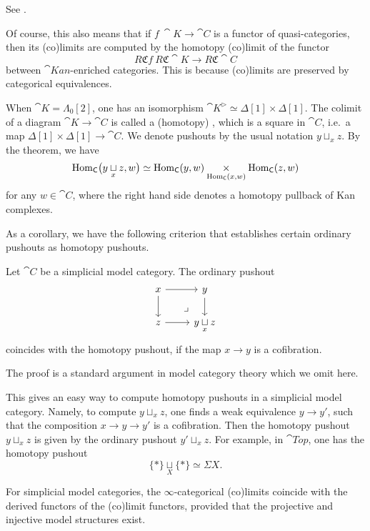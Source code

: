 See \cite[Theorem~4.2.4.1]{htt}.

Of course, this also means that if $f\:\cat K\to\cat C$
is a functor of quasi-categories, then its (co)limits are computed by
the homotopy (co)limit of the functor
\[ R\mathfrak Cf\:R\mathfrak C\cat K\to R\mathfrak C\cat C \]
between $\cat{Kan}$-enriched categories.
This is because (co)limits are preserved by categorical equivalences.

\begin{example}
    When $\cat K=\Lambda_0[2]$, one has an isomorphism
    $\cat K^\vartriangleright\simeq\Delta[1]\times\Delta[1]$.
    The colimit of a diagram $\cat K\to\cat C$ is called a (homotopy) ,
    which is a square in $\cat C$, i.e.\ a map $\Delta[1]\times\Delta[1]\to\cat C$.
    We denote pushouts by the usual notation $y\sqcup_xz$.
    By the theorem, we have 
    \[ \operatorname{Hom}_{\mathsf{C}}\bigl(y\underset{x}{\sqcup}z,w\bigr)\simeq
    \operatorname{Hom}_{\mathsf{C}}(y,w)\underset{\operatorname{Hom}_{\mathsf{C}}(x,w)}{\times}\operatorname{Hom}_{\mathsf{C}}(z,w) \]
    for any $w\in\cat C$,
    where the right hand side denotes a homotopy pullback of Kan complexes. 
    \varqed
\end{example}

As a corollary, we have the following criterion
that establishes certain ordinary pushouts as homotopy pushouts.

\begin{proposition}
    Let $\cat C$ be a simplicial model category.
    The ordinary pushout 
    \[ \begin{tikzcd}
        x\ar[r]\ar[d]\ar[dr,phantom,pos=.7,"\lrcorner"] & y\ar[d] \\
        z\ar[r] & y\underset{x}{\sqcup}z
    \end{tikzcd} \]
    coincides with the homotopy pushout,
    if the map $x\to y$ is a cofibration.
\end{proposition}

The proof is a standard argument in model category theory 
which we omit here.

This gives an easy way to compute homotopy pushouts
in a simplicial model category. Namely,
to compute $y\sqcup_xz$, one finds a weak equivalence $y\to y'$,
such that the composition $x\to y\to y'$ is a cofibration.
Then the homotopy pushout $y\sqcup_xz$
is given by the ordinary pushout $y'\sqcup_xz$. For example,
in $\cat{Top}$, one has the homotopy pushout
\[ \{*\}\underset{X}{\sqcup}\{*\}\simeq\Sigma X. \]

\begin{remark}
    For simplicial model categories, 
    the $\infty$-categorical (co)limits coincide with 
    the derived functors of the (co)limit functors,
    provided that the projective and injective model structures exist.
    \varqed
\end{remark}

